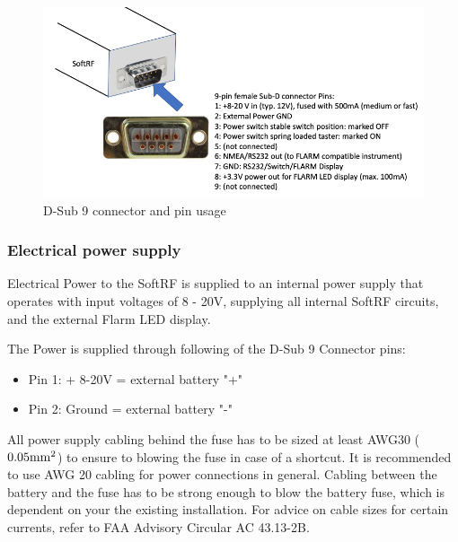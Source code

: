 \documentclass[11pt,a4paper]{article}
\begin{document}
\begin{figure}[h]
\centering
\includegraphics[scale=.5]{d-sub-9.png}
\caption{D-Sub 9 connector and pin usage}\label{d-sub-9}
\end{figure}\FloatBarrier

\subsubsection{Electrical power supply}
Electrical Power to the SoftRF is supplied to an internal power supply that operates with input voltages of 8 - 20V, supplying all internal SoftRF circuits, and the external Flarm LED display.

The Power is supplied through following of the D-Sub 9 Connector pins:

\begin{itemize}
\item Pin 1: + 8-20V = external battery "+"
\item Pin 2: Ground = external battery "-"
\end{itemize}

\begin{center}\end{center}

All power supply cabling behind the fuse has to be sized at least AWG30 ($0.05 {\rm mm}^2$) to ensure to blowing the fuse in case of a shortcut. It is recommended to use AWG 20 cabling for power connections in general. Cabling between the battery and the fuse has to be strong enough to blow the battery fuse, which is dependent on your the existing installation. For advice on cable sizes for certain currents, refer to FAA Advisory Circular AC 43.13-2B.
\end{document}
